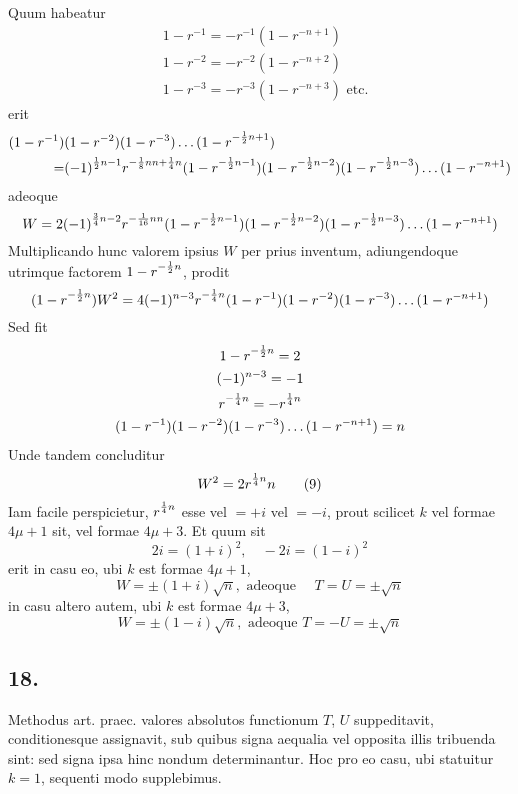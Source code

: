 \documentclass[twoside,12pt]{memoir}
\let\oldfrac\frac
\def\frac#1#2{\mathchoice{\tfrac{#1}{#2}}{\oldfrac{#1}{#2}}{\genfrac{}{}{}{2}{#1}{#2\mathstrut}}{\genfrac{}{}{}{3}{#1}{#2\mathstrut}}}
\begin{document}
Quum habeatur
\[\begin{aligned}
& 1-r^{-1}=-r^{-1}(1-r^{-n+1}) \\
& 1-r^{-2}=-r^{-2}(1-r^{-n+2}) \\
& 1-r^{-3}=-r^{-3}(1-r^{-n+3}) \text{ etc.}
\end{aligned}\]
erit
\[\begin{aligned}
 (1-r^{-1})&(1-r^{-2})(1-r^{-3}) \ldots(1-r^{-\frac{1}{2} n+1}) \\
=&(-1)^{\frac{1}{2} n-1} r^{-\frac{1}{8} n n+\frac{1}{4} n}(1-r^{-\frac{1}{2} n-1})(1-r^{-\frac{1}{2} n-2})(1-r^{-\frac{1}{2} n-3}) \ldots(1-r^{-n+1})
\end{aligned}\]
adeoque
\[W=2(-1)^{\frac{3}{4} n-2} r^{-\frac{1}{16} n n}(1-r^{-\frac{1}{2} n-1})(1-r^{-\frac{1}{2} n-2})(1-r^{-\frac{1}{2} n-3}) \ldots(1-r^{-n+1})\]
Multiplicando hunc valorem ipsius \(W\) per prius inventum, adiungendoque utrimque factorem \(1-r^{-\frac{1}{2} n}\), prodit
\[(1-r^{-\frac{1}{2} n}) W^{2}=4(-1)^{n-3} r^{-\frac{1}{4} n}(1-r^{-1})(1-r^{-2})(1-r^{-3}) \ldots(1-r^{-n+1})\]
Sed fit
\[\begin{gathered}
1-r^{-\frac{1}{2} n}=2 \\
(-1)^{n-3}=-1 \\
r^{-\frac{1}{4} n}=-r^{\frac{1}{4} n} \\
(1-r^{-1})(1-r^{-2})(1-r^{-3}) \ldots(1-r^{-n+1})=n
\end{gathered}\]
Unde tandem concluditur\pagebreak%
\[ W^{2}=2 r^{\frac{1}{4} n} n \tag{9}\]
Iam facile perspicietur, \(r^{\frac{1}{4} n}\) esse vel \(=+i\) vel \(=-i\), prout scilicet \(k\) vel formae \(4 \mu+1\) sit, vel formae \(4 \mu+3\). Et quum sit
\[2 i=(1+i)^{2}, \quad-2 i=(1-i)^{2}\]
erit in casu eo, ubi \(k\) est formae \(4 \mu+1\),
\[W= \pm(1+i) \surd n, \text{ adeoque } \quad T=U= \pm \surd n\]
in casu altero autem, ubi \(k\) est formae \(4 \mu+3\),
\[W= \pm(1-i) \surd n, \text{ adeoque } T=-U= \pm \surd n\]

\subsection*{18.}
 
Methodus art. praec. valores absolutos functionum \(T\), \(U\) suppeditavit, conditionesque assignavit, sub quibus signa aequalia vel opposita illis tribuenda sint: sed signa ipsa hinc nondum determinantur. Hoc pro eo casu, ubi statuitur \(k=1\), sequenti modo supplebimus.
 
\end{document}
